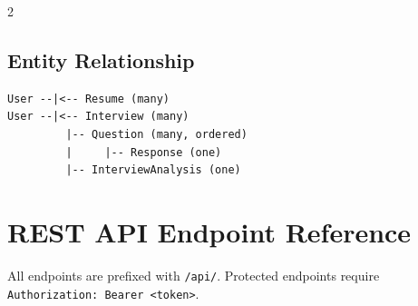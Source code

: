 \documentclass[10pt, a4paper]{article}
\begin{document}
\begin{multicols}{2}
\subsection{Entity Relationship}
\begin{codebox}
\footnotesize
\begin{verbatim}
User --|<-- Resume (many)
User --|<-- Interview (many)
         |-- Question (many, ordered)
         |     |-- Response (one)
         |-- InterviewAnalysis (one)
\end{verbatim}
\end{codebox}

\section{REST API Endpoint Reference}

All endpoints are prefixed with \texttt{/api/}.
Protected endpoints require \texttt{Authorization: Bearer <token>}.


\end{multicols}
\end{document}
